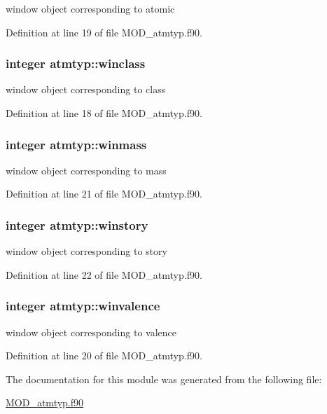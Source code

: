 window object corresponding to atomic 



Definition at line 19 of file M\-O\-D\-\_\-atmtyp.\-f90.

\hypertarget{classatmtyp_a7ae85452dea141868af664ea293b73d7}{
\subsubsection[{winclass}]{\setlength{\rightskip}{0pt plus 5cm}integer atmtyp\-::winclass}}\label{classatmtyp_a7ae85452dea141868af664ea293b73d7}


window object corresponding to class 



Definition at line 18 of file M\-O\-D\-\_\-atmtyp.\-f90.

\hypertarget{classatmtyp_ad0875491364a5b57ce9f73a7b821aa47}{
\subsubsection[{winmass}]{\setlength{\rightskip}{0pt plus 5cm}integer atmtyp\-::winmass}}\label{classatmtyp_ad0875491364a5b57ce9f73a7b821aa47}


window object corresponding to mass 



Definition at line 21 of file M\-O\-D\-\_\-atmtyp.\-f90.

\hypertarget{classatmtyp_a7083dc9b2ebd8a47554e57ebfe81c573}{
\subsubsection[{winstory}]{\setlength{\rightskip}{0pt plus 5cm}integer atmtyp\-::winstory}}\label{classatmtyp_a7083dc9b2ebd8a47554e57ebfe81c573}


window object corresponding to story 



Definition at line 22 of file M\-O\-D\-\_\-atmtyp.\-f90.

\hypertarget{classatmtyp_afea969ea2b20527ccc4ac738111d7e76}{
\subsubsection[{winvalence}]{\setlength{\rightskip}{0pt plus 5cm}integer atmtyp\-::winvalence}}\label{classatmtyp_afea969ea2b20527ccc4ac738111d7e76}


window object corresponding to valence 



Definition at line 20 of file M\-O\-D\-\_\-atmtyp.\-f90.



The documentation for this module was generated from the following file\-:\begin{DoxyCompactItemize}
\item 
\hyperlink{MOD__atmtyp_8f90}{M\-O\-D\-\_\-atmtyp.\-f90}\end{DoxyCompactItemize}
